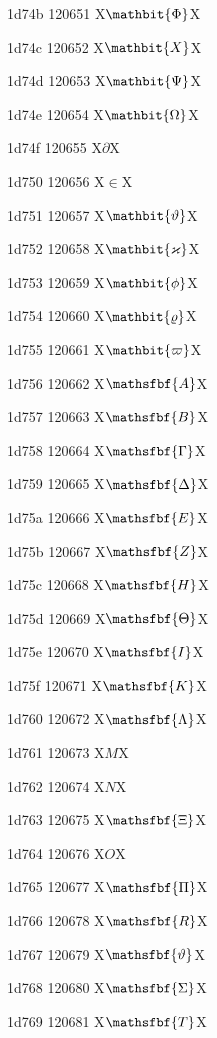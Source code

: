 \documentclass[11pt]{article}
\begin{document}
1d74b 120651 X{\ensuremath{\mathbit{\Phi}}}X

1d74c 120652 X{\ensuremath{\mathbit{X}}}X

1d74d 120653 X{\ensuremath{\mathbit{\Psi}}}X

1d74e 120654 X{\ensuremath{\mathbit{\Omega}}}X

1d74f 120655 X{\ensuremath{\partial}}X

1d750 120656 X{\ensuremath{\in}}X

1d751 120657 X{\ensuremath{\mathbit{\vartheta}}}X

1d752 120658 X{\ensuremath{\mathbit{\varkappa}}}X

1d753 120659 X{\ensuremath{\mathbit{\phi}}}X

1d754 120660 X{\ensuremath{\mathbit{\varrho}}}X

1d755 120661 X{\ensuremath{\mathbit{\varpi}}}X

1d756 120662 X{\ensuremath{\mathsfbf{A}}}X

1d757 120663 X{\ensuremath{\mathsfbf{B}}}X

1d758 120664 X{\ensuremath{\mathsfbf{\Gamma}}}X

1d759 120665 X{\ensuremath{\mathsfbf{\Delta}}}X

1d75a 120666 X{\ensuremath{\mathsfbf{E}}}X

1d75b 120667 X{\ensuremath{\mathsfbf{Z}}}X

1d75c 120668 X{\ensuremath{\mathsfbf{H}}}X

1d75d 120669 X{\ensuremath{\mathsfbf{\Theta}}}X

1d75e 120670 X{\ensuremath{\mathsfbf{I}}}X

1d75f 120671 X{\ensuremath{\mathsfbf{K}}}X

1d760 120672 X{\ensuremath{\mathsfbf{\Lambda}}}X

1d761 120673 X{\ensuremath{M}}X

1d762 120674 X{\ensuremath{N}}X

1d763 120675 X{\ensuremath{\mathsfbf{\Xi}}}X

1d764 120676 X{\ensuremath{O}}X

1d765 120677 X{\ensuremath{\mathsfbf{\Pi}}}X

1d766 120678 X{\ensuremath{\mathsfbf{R}}}X

1d767 120679 X{\ensuremath{\mathsfbf{\vartheta}}}X

1d768 120680 X{\ensuremath{\mathsfbf{\Sigma}}}X

1d769 120681 X{\ensuremath{\mathsfbf{T}}}X
\end{document}
